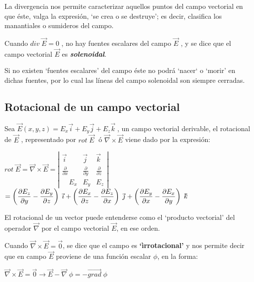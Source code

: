 	La divergencia nos permite caracterizar aquellos puntos del campo vectorial en que éste, valga la expresión, `se crea o se destruye'; es decir, clasifica los manantiales o sumideros del campo. 

	Cuando $div \; \vec E = 0$ , no hay fuentes escalares del campo $\vec E$ , y se dice que el campo vectorial $\vec E$ es \textbf{\emph{solenoidal}}. 

	Si no existen `fuentes escalares' del campo éste no podrá `nacer` o `morir' en dichas fuentes, por lo cual las líneas del campo solenoidal son siempre cerradas. 

\subsection{Rotacional de un campo vectorial}

Sea $\vec E (x,y,z)=E_x \vec i + E_y \vec j + E_z \vec k\;$, un campo vectorial derivable, el rotacional de $\vec E$ , representado por $rot \; \vec E\; $ ó $\overrightarrow{\nabla} \times \vec E$ viene dado por la expresión:

\vspace{4mm} $rot \; \vec E = \overrightarrow{\nabla} \times \overrightarrow {E} = \left| \begin{matrix} \vec { i }  & \vec { j }  & \vec { k }  \\ \frac { \partial  }{ \partial x }  & \frac { \partial  }{ \partial y }  & \frac { \partial  }{ \partial z }  \\ \quad E_{ x } & E_{ y } & E_{ z } \end{matrix} \right| $
$=\tiny{\left( \dfrac{\partial E_z}{\partial y} -\dfrac{\partial E_y}{\partial z} \right) \; \vec i + \left(\dfrac{\partial E_x}{\partial z} -\dfrac{\partial E_z}{\partial x} \right)\; \vec j+ \left(\dfrac{\partial E_y}{\partial x} -\dfrac{\partial E_x}{\partial y} \right)\; \vec k}$

\vspace{3mm}El rotacional de un vector puede entenderse como el `producto vectorial' del operador $\overrightarrow{\nabla}$ por el campo vectorial $\overrightarrow{E}$, en ese orden.

Cuando $\overrightarrow{\nabla} \times \overrightarrow {E}=\overrightarrow{0}$, se dice que el campo es \textbf{`ìrrotacional'} y nos permite decir que en campo $\overrightarrow {E}$ proviene de una función escalar $\phi$, en la forma:

$\overrightarrow{\nabla} \times \overrightarrow {E}=\overrightarrow{0} \longrightarrow \overrightarrow{E}-\overrightarrow{\nabla}\; \phi=-\overrightarrow{grad}\; \phi$

